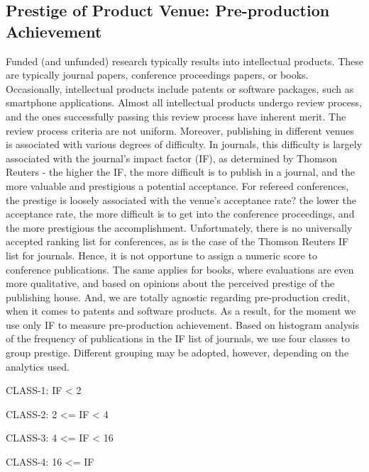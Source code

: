 \subsection {Prestige of Product Venue: Pre-production Achievement}
Funded (and unfunded) research typically results into intellectual products. These are typically journal papers, conference proceedings papers, or books. Occasionally, intellectual products include patents or software packages, such as smartphone applications. Almost all intellectual products undergo review process, and the ones successfully passing this review process have inherent merit.  The review process criteria are not uniform. Moreover, publishing in different venues is associated with various degrees of difficulty. In journals, this difficulty is largely associated with the journal's impact factor (IF), as determined by Thomson Reuters - the higher the IF, the more difficult is to publish in a journal, and the more valuable and prestigious a potential acceptance. For refereed conferences, the prestige is loosely associated with the venue's acceptance rate? the lower the acceptance rate, the more difficult is to get into the conference proceedings, and the more prestigious the accomplishment. Unfortunately, there is no universally accepted ranking list for conferences, as is the case of the Thomson Reuters IF list for journals. Hence, it is not opportune to assign a numeric score to conference publications. The same applies for books, where evaluations are even more qualitative, and based on opinions about the perceived prestige of the publishing house. And, we are totally agnostic regarding pre-production credit, when it comes to patents and software products.
As a result, for the moment we use only IF to measure pre-production achievement. Based on histogram analysis of the frequency of publications in the IF list of journals, we use four classes to group prestige. Different grouping may be adopted, however, depending on the analytics used. 

\begin{description}
\item CLASS-1: IF < 2
\item CLASS-2: 2 <= IF < 4
\item CLASS-3: 4 <= IF < 16
\item CLASS-4: 16 <= IF
\end{description}






